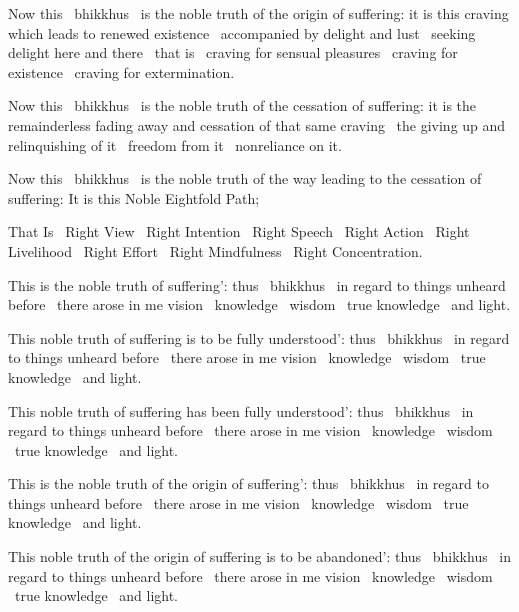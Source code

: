Now this \breathmark\ bhikkhus \breathmark\ is the noble truth of the origin of suffering: it is this craving which leads to renewed existence \breathmark\ accompanied by delight and lust \breathmark\ seeking delight here and there \breathmark\ that is \breathmark\ craving for sensual pleasures \breathmark\ craving for existence \breathmark\ craving for extermination.

Now this \breathmark\ bhikkhus \breathmark\ is the noble truth of the cessation of suffering: it is the remainderless fading away and cessation of that same craving \breathmark\ the giving up and relinquishing of it \breathmark\ freedom from it \breathmark\ nonreliance on it.

Now this \breathmark\ bhikkhus \breathmark\ is the noble truth of the way leading to the cessation of suffering: It is this Noble Eightfold Path;

That Is \breathmark\ Right View \breathmark\ Right Intention \breathmark\ Right Speech \breathmark\ Right Action \breathmark\ Right Livelihood \breathmark\ Right Effort \breathmark\ Right Mindfulness \breathmark\ Right Concentration.

This is the noble truth of suffering’: thus \breathmark\ bhikkhus \breathmark\ in regard to things unheard before \breathmark\ there arose in me vision \breathmark\ knowledge \breathmark\ wisdom \breathmark\ true knowledge \breathmark\ and light.

This noble truth of suffering is to be fully understood’: thus \breathmark\ bhikkhus \breathmark\ in regard to things unheard before \breathmark\ there arose in me vision \breathmark\ knowledge \breathmark\ wisdom \breathmark\ true knowledge \breathmark\ and light.

This noble truth of suffering has been fully understood’: thus \breathmark\ bhikkhus \breathmark\ in regard to things unheard before \breathmark\ there arose in me vision \breathmark\ knowledge \breathmark\ wisdom \breathmark\ true knowledge \breathmark\ and light.

This is the noble truth of the origin of suffering’: thus \breathmark\ bhikkhus \breathmark\ in regard to things unheard before \breathmark\ there arose in me vision \breathmark\ knowledge \breathmark\ wisdom \breathmark\ true knowledge \breathmark\ and light.

This noble truth of the origin of suffering is to be abandoned’: thus \breathmark\ bhikkhus \breathmark\ in regard to things unheard before \breathmark\ there arose in me vision \breathmark\ knowledge \breathmark\ wisdom \breathmark\ true knowledge \breathmark\ and light.

